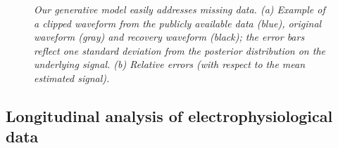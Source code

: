 \documentclass[journal]{IEEEtran}
\begin{document}
\begin{figure}[!htbp]
\centering
{} 
  \caption{\small \emph{ Our generative model easily addresses missing data.
(a) Example of a clipped waveform from the publicly available data (blue), original waveform (gray) and
  recovery waveform (black); the error bars reflect one standard deviation from the posterior distribution on the underlying signal. (b) Relative errors (with respect to the mean estimated signal).
   }}
\end{figure}




\subsection{{Longitudinal analysis of } electrophysiological data\label{sec:forensics}}
\end{document}

